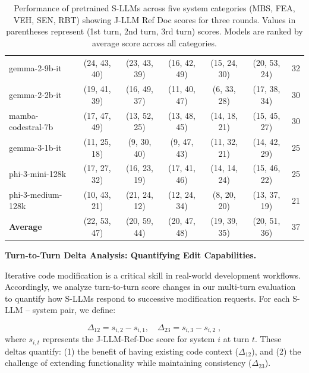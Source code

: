 \documentclass{ieeeaccess}
\newcommand{\noindentBold}[1]{\par\noindent\textbf{#1}}
\begin{document}
\begin{table}[htbp]
{\begin{tabular}{lcccccc}
          gemma-2-9b-it & (24, 43, 40) & (23, 43, 39) & (16, 42, 49) & (15, 24, 30) & (20, 53, 24) & 32 \\
          gemma-2-2b-it & (19, 41, 39) & (16, 49, 37) & (11, 40, 47) & (6, 33, 28) & (17, 38, 34) & 30 \\
          mamba-codestral-7b & (17, 47, 49) & (13, 52, 25) & (13, 48, 45) & (14, 18, 21) & (15, 45, 27) & 30 \\
          gemma-3-1b-it & (11, 25, 18) & (9, 30, 40) & (9, 47, 43) & (11, 32, 21) & (14, 42, 29) & 25 \\
          phi-3-mini-128k & (17, 27, 32) & (16, 23, 19) & (17, 41, 46) & (14, 14, 24) & (15, 46, 22) & 25 \\
          phi-3-medium-128k & (10, 43, 21) & (21, 24, 12) & (12, 24, 34) & (8, 20, 20) & (13, 37, 19) & 21 \\
          \midrule
          \textbf{Average} & (22, 53, 47) & (20, 59, 44) & (20, 47, 48) & (19, 39, 35) & (20, 51, 36) & 37 \\
          \bottomrule
          \end{tabular}
          }
          \caption{Performance of pretrained S-LLMs across five system categories (MBS, FEA, VEH, SEN, RBT) showing J-LLM Ref Doc scores for three rounds. Values in parentheses represent (1st turn, 2nd turn, 3rd turn) scores. Models are ranked by average score across all categories.}
          \vspace{-10pt}
          \label{tab:llm_metrics_jllm}
      \end{table}
\medskip
{\noindentBold{Turn-to-Turn Delta Analysis: Quantifying Edit Capabilities.}}
\label{subsec:multiturn_delta}
Iterative code modification is a critical skill in real-world development workflows. Accordingly, we analyze turn-to-turn score changes in our multi-turn evaluation to quantify how S-LLMs respond to successive modification requests. For each S-LLM -- system pair, we define:

\begin{equation}
\Delta_{12} = s_{i,2} - s_{i,1}, \quad \Delta_{23} = s_{i,3} - s_{i,2} \; ,
\end{equation}
where $s_{i,t}$ represents the J-LLM-Ref-Doc score for system $i$ at turn $t$. These deltas quantify: (1) the benefit of having existing code context ($\Delta_{12}$), and (2) the challenge of extending functionality while maintaining consistency ($\Delta_{23}$).
\end{document}
